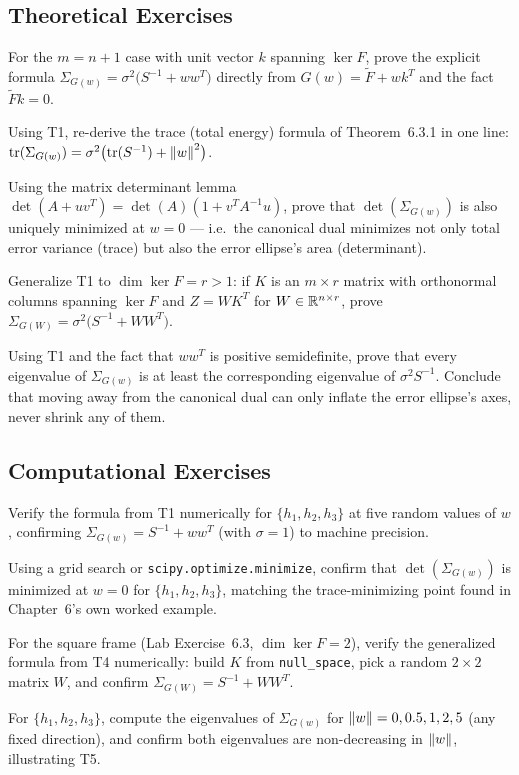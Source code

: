 \subsection*{Theoretical Exercises}
\begin{theoexercises}
	\item For the $m=n+1$ case with unit vector $k$ spanning $\ker F$,
	prove the explicit formula
	$\Sigma_{G(w)}=\sigma^2\bigl(S^{-1}+ww^T\bigr)$
	directly from $G(w)=\tilde F+wk^T$ and the fact $\tilde F k=0$.
	
	\item Using T1, re-derive the trace (total energy) formula of
	Theorem~6.3.1 in one line: $\operatorname{tr}(\Sigma_{G(w)})=
	\sigma^2\bigl(\operatorname{tr}(S^{-1})+\left\| w \right\|^2\bigr)$.
	
	\item Using the matrix determinant lemma
	$\det(A+uv^T)=\det(A)(1+v^TA^{-1}u)$, prove that
	$\det(\Sigma_{G(w)})$ is also uniquely minimized at $w=0$ ---
	i.e.\ the canonical dual minimizes not only total error variance
	(trace) but also the error ellipse's area (determinant).
	
	\item Generalize T1 to $\dim\ker F=r>1$: if $K$ is an $m\times r$
	matrix with orthonormal columns spanning $\ker F$ and
	$Z=WK^T$ for $W\in\mathbb{R}^{n\times r}$, prove
	$\Sigma_{G(W)}=\sigma^2\bigl(S^{-1}+WW^T\bigr)$.
	
	\item Using T1 and the fact that $ww^T$ is positive semidefinite,
	prove that every eigenvalue of $\Sigma_{G(w)}$ is at least the
	corresponding eigenvalue of $\sigma^2S^{-1}$. Conclude that moving
	away from the canonical dual can only inflate the error ellipse's
	axes, never shrink any of them.
\end{theoexercises}

\subsection*{Computational Exercises}
\begin{compexercises}
	\item Verify the formula from T1 numerically for $\{h_1,h_2,h_3\}$ at
	five random values of $w$, confirming
	$\Sigma_{G(w)}=S^{-1}+ww^T$ (with $\sigma=1$) to machine
	precision.
	
	\item Using a grid search or \texttt{scipy.optimize.minimize}, confirm
	that $\det(\Sigma_{G(w)})$ is minimized at $w=0$ for
	$\{h_1,h_2,h_3\}$, matching the trace-minimizing point found in
	Chapter~6's own worked example.
	
	\item For the square frame (Lab Exercise~6.3, $\dim\ker F=2$), verify
	the generalized formula from T4 numerically: build $K$ from
	\texttt{null\_space}, pick a random $2\times2$ matrix $W$, and
	confirm $\Sigma_{G(W)}=S^{-1}+WW^T$.
	
	\item For $\{h_1,h_2,h_3\}$, compute the eigenvalues of
	$\Sigma_{G(w)}$ for $\left\| w \right\|=0,0.5,1,2,5$ (any fixed direction),
	and confirm both eigenvalues are non-decreasing in $\left\| w \right\|$,
	illustrating T5.
\end{compexercises}
